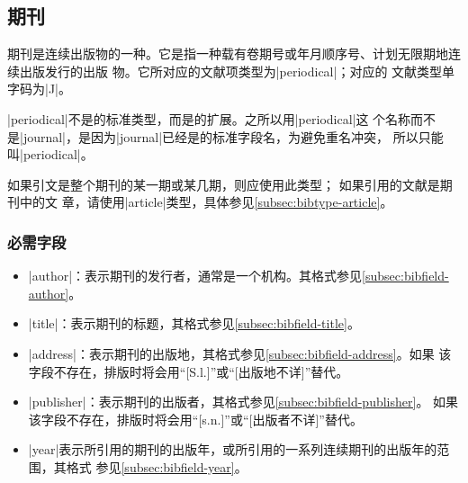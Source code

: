 
\subsection{期刊}\label{subsec:bibtype-periodical}

期刊是连续出版物的一种。它是指一种载有卷期号或年月顺序号、计划无限期地连续出版发行的出版
物\cite{gbt7714-2005}。它所对应的{\BibTeX}文献项类型为|periodical|；对应的
文献类型单字码为|J|\cite{gbt3469-1983}。

|periodical|不是{\BibTeX}的标准类型，而是{\njuthesis}的扩展。之所以用|periodical|这
个名称而不是|journal|，是因为|journal|已经是{\BibTeX}的标准字段名，为避免重名冲突，
所以只能叫|periodical|。

\begin{note}
如果引文是整个期刊的某一期或某几期，则应使用此类型； 如果引用的文献是期刊中的文
章，请使用|article|类型，具体参见\ref{subsec:bibtype-article}。
\end{note}

\subsubsection{必需字段}

\begin{itemize}
\item |author|：表示期刊的发行者，通常是一个机构。其格式参见\ref{subsec:bibfield-author}。
\item |title|：表示期刊的标题，其格式参见\ref{subsec:bibfield-title}。
\item |address|：表示期刊的出版地，其格式参见\ref{subsec:bibfield-address}。如果
  该字段不存在，{\BibTeX}排版时将会用``[S.l.]''或``[出版地不详]''替代。
\item |publisher|：表示期刊的出版者，其格式参见\ref{subsec:bibfield-publisher}。
  如果该字段不存在，{\BibTeX}排版时将会用``[s.n.]''或``[出版者不详]''替代。
\item |year|表示所引用的期刊的出版年，或所引用的一系列连续期刊的出版年的范围，其格式
  参见\ref{subsec:bibfield-year}。
\end{itemize}

